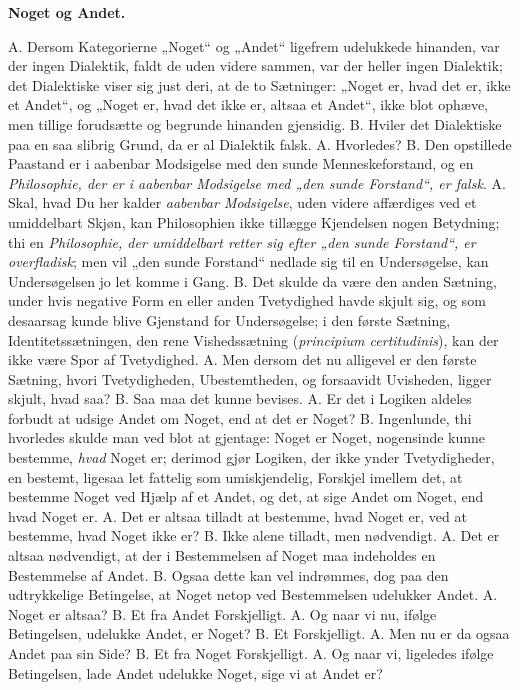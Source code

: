 \documentclass[12pt,a4paper]{book}
\begin{document}
\textbf{Noget og Andet.}
A. Dersom Kategorierne „Noget“ og „Andet“ ligefrem udelukkede hinanden,
var der ingen Dialektik, faldt de uden videre sammen, var der heller
ingen Dialektik; det Dialektiske viser sig just deri, at de to
Sætninger: „Noget er, hvad det er, ikke et Andet“, og „Noget er, hvad
det ikke er, altsaa et Andet“, ikke blot ophæve, men tillige forudsætte
og begrunde hinanden gjensidig. B. Hviler det Dialektiske paa en saa
slibrig Grund, da er al Dialektik falsk. A. Hvorledes? B. Den
opstillede Paastand er i aabenbar Modsigelse med den sunde
Menneskeforstand, og en \emph{Philosophie, der er i aabenbar Modsigelse
med „den sunde Forstand“, er falsk}. A. Skal, hvad Du her kalder
\emph{aabenbar Modsigelse}, uden videre affærdiges ved et umiddelbart
Skjøn, kan Philosophien ikke tillægge Kjendelsen nogen Betydning; thi en
\emph{Philosophie, der umiddelbart
retter sig efter „den sunde Forstand“, er overfladisk}; men vil „den
sunde Forstand“ nedlade sig til en Undersøgelse, kan Undersøgelsen jo
let komme i Gang. B. Det skulde da være den anden Sætning, under hvis
negative Form en eller anden Tvetydighed havde skjult sig, og som
desaarsag kunde blive Gjenstand for Undersøgelse; i den første Sætning,
Identitetssætningen, den rene Vishedssætning (\textit{principium
certitudinis}), kan der ikke være Spor af Tvetydighed. A. Men dersom
det nu alligevel er den første Sætning, hvori Tvetydigheden,
Ubestemtheden, og forsaavidt Uvisheden, ligger skjult, hvad saa? B. Saa
maa det kunne bevises. A. Er det i Logiken aldeles forbudt at udsige
Andet om Noget, end at det er Noget? B. Ingenlunde, thi hvorledes
skulde man ved blot at gjentage: Noget er Noget, nogensinde kunne
bestemme, \emph{hvad} Noget er; derimod gjør Logiken, der ikke ynder
Tvetydigheder, en bestemt, ligesaa let fattelig som umiskjendelig,
Forskjel imellem det, at bestemme Noget ved Hjælp af et Andet, og det,
at sige Andet om Noget, end hvad Noget er. A. Det er altsaa tilladt at
bestemme, hvad Noget er, ved at bestemme, hvad Noget ikke er? B. Ikke
alene tilladt, men nødvendigt. A. Det er altsaa nødvendigt, at der i
Bestemmelsen af Noget maa indeholdes en Bestemmelse af Andet. B. Ogsaa
dette kan vel indrømmes, dog paa den udtrykkelige Betingelse, at Noget
netop ved Bestemmelsen udelukker Andet. A. Noget er altsaa? B. Et fra
Andet Forskjelligt. A. Og naar vi nu, ifølge Betingelsen, udelukke
Andet, er Noget? B. Et Forskjelligt. A. Men nu er da ogsaa Andet paa
sin Side? B. Et fra Noget Forskjelligt. A. Og naar vi, ligeledes
ifølge Betingelsen, lade Andet udelukke Noget, sige vi at Andet er?
\end{document}
